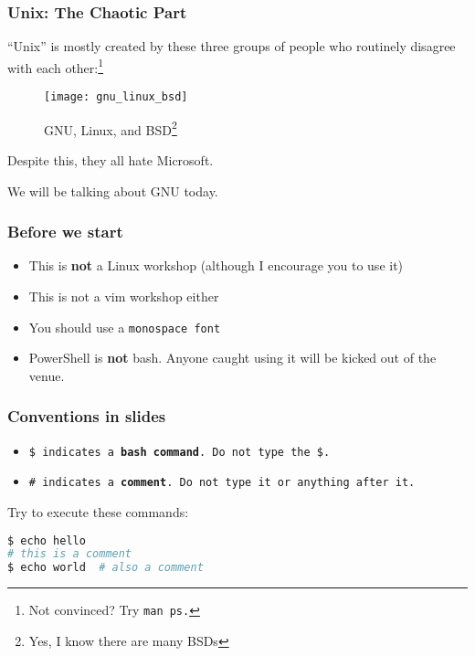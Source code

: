 \begin{frame}
\frametitle{Unix: The Chaotic Part}
``Unix'' is mostly created by these three groups of people who routinely
disagree with each other:\footnote{Not convinced? Try \tt{man ps}.}
\begin{figure}[h]
    \centering
    \texttt{[image: gnu\_linux\_bsd]}
    \caption{GNU, Linux, and BSD\footnote{Yes, I know there are many BSDs}}
\end{figure}
Despite this, they all hate Microsoft.

We will be talking about GNU today.
\end{frame}

\begin{frame}
\frametitle{Before we start}
\begin{itemize}
    \item This is \textbf{not} a Linux workshop
        (although I encourage you to use it)
    \item This is not a vim workshop either
    \item You should use a \tt{monospace} font
    \item PowerShell is \textbf{not} bash. Anyone caught using it will be
        kicked out of the venue.
\end{itemize}
\end{frame}

\begin{frame}[fragile]
\frametitle{Conventions in slides}
\begin{itemize}
    \item \tt{\$} indicates a \textbf{bash command}.
        Do not type the \tt{\$}.
    \item \tt{\#} indicates a \textbf{comment}.
        Do not type it or anything after it.
\end{itemize}
Try to execute these commands:
\begin{lstlisting}[language=bash]
$ echo hello
# this is a comment
$ echo world  # also a comment
\end{lstlisting}
\end{frame}
